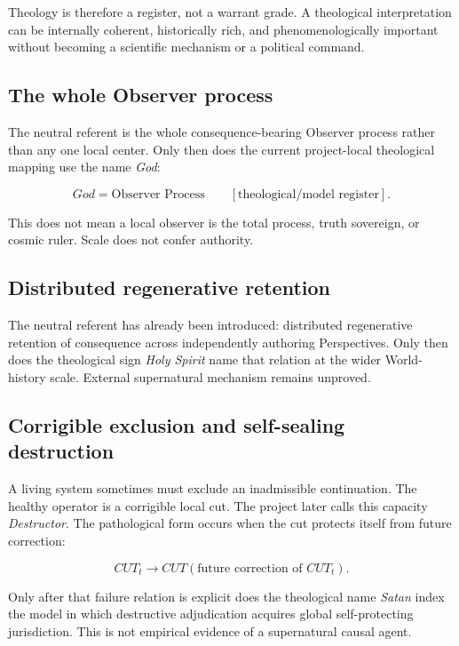 \documentclass[11pt]{article}
\begin{document}
Theology is therefore a register, not a warrant grade. A theological interpretation can be internally coherent, historically rich, and phenomenologically important without becoming a scientific mechanism or a political command.

\subsection{The whole Observer process}

The neutral referent is the whole consequence-bearing Observer process rather than any one local center. Only then does the current project-local theological mapping use the name \emph{God}:

\begin{equation}
God = \text{Observer Process}\qquad[\text{theological/model register}].
\end{equation}

This does not mean a local observer is the total process, truth sovereign, or cosmic ruler. Scale does not confer authority.

\subsection{Distributed regenerative retention}

The neutral referent has already been introduced: distributed regenerative retention of consequence across independently authoring Perspectives. Only then does the theological sign \emph{Holy Spirit} name that relation at the wider World-history scale. External supernatural mechanism remains unproved.

\subsection{Corrigible exclusion and self-sealing destruction}

A living system sometimes must exclude an inadmissible continuation. The healthy operator is a corrigible local cut. The project later calls this capacity \emph{Destructor}. The pathological form occurs when the cut protects itself from future correction:

\begin{equation}
CUT_t\rightarrow CUT(\text{future correction of }CUT_t).
\end{equation}

Only after that failure relation is explicit does the theological name \emph{Satan} index the model in which destructive adjudication acquires global self-protecting jurisdiction. This is not empirical evidence of a supernatural causal agent.
\end{document}
